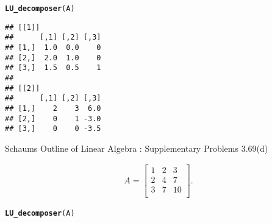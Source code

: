 \documentclass[11pt, a4paper]{article}\usepackage[]{graphicx}\usepackage[]{xcolor}
\makeatletter
\newcommand{\hldef}[1]{\textcolor[rgb]{0.345,0.345,0.345}{#1}}%
\newcommand{\hlkwd}[1]{\textcolor[rgb]{0.737,0.353,0.396}{\textbf{#1}}}%
\newenvironment{kframe}{%
 \def\at@end@of@kframe{}%
 \ifinner\ifhmode%
  \def\at@end@of@kframe{\end{minipage}}%
  \begin{minipage}{\columnwidth}%
 \fi\fi%
 \def\FrameCommand##1{\hskip\@totalleftmargin \hskip-\fboxsep
 \colorbox{shadecolor}{##1}\hskip-\fboxsep
     \hskip-\linewidth \hskip-\@totalleftmargin \hskip\columnwidth}%
 \MakeFramed {\advance\hsize-\width
   \@totalleftmargin\z@ \linewidth\hsize
   \@setminipage}}%
 {\par\unskip\endMakeFramed%
 \at@end@of@kframe}
\newenvironment{knitrout}{}{} %
\makeatother
\begin{document}
\begin{knitrout}
\color{fgcolor}\begin{kframe}
\begin{alltt}
\hlkwd{LU_decomposer}\hldef{(A)}
\end{alltt}
\begin{verbatim}
## [[1]]
##      [,1] [,2] [,3]
## [1,]  1.0  0.0    0
## [2,]  2.0  1.0    0
## [3,]  1.5  0.5    1
## 
## [[2]]
##      [,1] [,2] [,3]
## [1,]    2    3  6.0
## [2,]    0    1 -3.0
## [3,]    0    0 -3.5
\end{verbatim}
\end{kframe}
\end{knitrout}


\leftpointright \hspace{0.2cm} Schaums Outline of Linear Algebra : Supplementary Problems 3.69(d)

\begin{gather*}
A = 
\begin{bmatrix}
1 & 2 & 3 \\
2 & 4 & 7 \\
3 & 7 & 10 \\
\end{bmatrix}.
\end{gather*}



\begin{knitrout}
\color{fgcolor}\begin{kframe}
\begin{alltt}
\hlkwd{LU_decomposer}\hldef{(A)}
\end{alltt}


{\ttfamily\noindent\bfseries\color{errorcolor}{\#\# Error in LU\_decomposer(A): All the leading principal minors must be non-zero.}}\end{kframe}
\end{knitrout}
\end{document}
